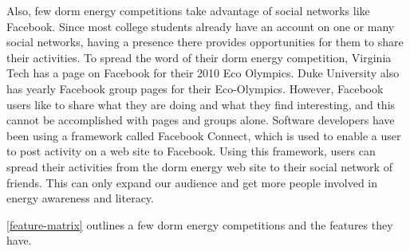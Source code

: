 Also, few dorm energy competitions take advantage of social networks like Facebook.  Since most college students already have an account on one or many social networks, having a presence there provides opportunities for them to share their activities.  To spread the word of their dorm energy competition, Virginia Tech has a page on Facebook for their 2010 Eco Olympics\cite{vt-facebook}.  Duke University also has yearly Facebook group pages for their Eco-Olympics\cite{duke-facebook}.  However, Facebook users like to share what they are doing and what they find interesting, and this cannot be accomplished with pages and groups alone.  Software developers have been using a framework called Facebook Connect, which is used to enable a user to post activity on a web site to Facebook.  Using this framework, users can spread their activities from the dorm energy web site to their social network of friends.  This can only expand our audience and get more people involved in energy awareness and literacy.

\autoref{feature-matrix} outlines a few dorm energy competitions and the features they have.

